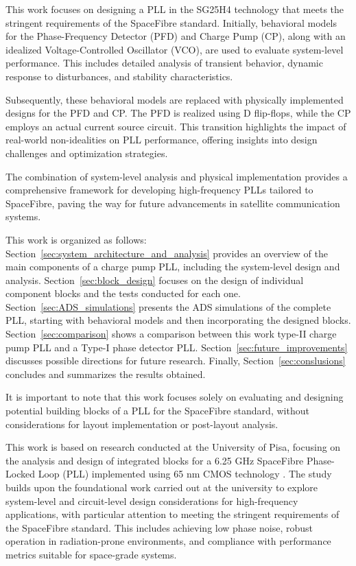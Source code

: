 \documentclass[lettersize,journal]{IEEEtran}
\begin{document}
This work focuses on designing a PLL in the SG25H4 technology that meets the stringent requirements of the SpaceFibre standard. Initially, behavioral models for the Phase-Frequency Detector (PFD) and Charge Pump (CP), along with an idealized Voltage-Controlled Oscillator (VCO), are used to evaluate system-level performance. This includes detailed analysis of transient behavior, dynamic response to disturbances, and stability characteristics.

Subsequently, these behavioral models are replaced with physically implemented designs for the PFD and CP. The PFD is realized using D flip-flops, while the CP employs an actual current source circuit. This transition highlights the impact of real-world non-idealities on PLL performance, offering insights into design challenges and optimization strategies.

The combination of system-level analysis and physical implementation provides a comprehensive framework for developing high-frequency PLLs tailored to SpaceFibre, paving the way for future advancements in satellite communication systems.

This work is organized as follows: Section~\ref{sec:system_architecture_and_analysis} provides an overview of the main components of a charge pump PLL, including the system-level design and analysis. Section~\ref{sec:block_design} focuses on the design of individual component blocks and the tests conducted for each one. Section~\ref{sec:ADS_simulations} presents the ADS simulations of the complete PLL, starting with behavioral models and then incorporating the designed blocks. Section~\ref{sec:comparison} shows a comparison between this work type-II charge pump PLL and a Type-I phase detector PLL. Section~\ref{sec:future_improvements} discusses possible directions for future research. Finally, Section~\ref{sec:conslusions} concludes and summarizes the results obtained.

It is important to note that this work focuses solely on evaluating and designing potential building blocks of a PLL for the SpaceFibre standard, without considerations for layout implementation or post-layout analysis.

This work is based on research conducted at the University of Pisa, focusing on the analysis and design of integrated blocks for a 6.25 GHz SpaceFibre Phase-Locked Loop (PLL) implemented using 65 nm CMOS technology \cite{original}. The study builds upon the foundational work carried out at the university to explore system-level and circuit-level design considerations for high-frequency applications, with particular attention to meeting the stringent requirements of the SpaceFibre standard. This includes achieving low phase noise, robust operation in radiation-prone environments, and compliance with performance metrics suitable for space-grade systems.
\end{document}
